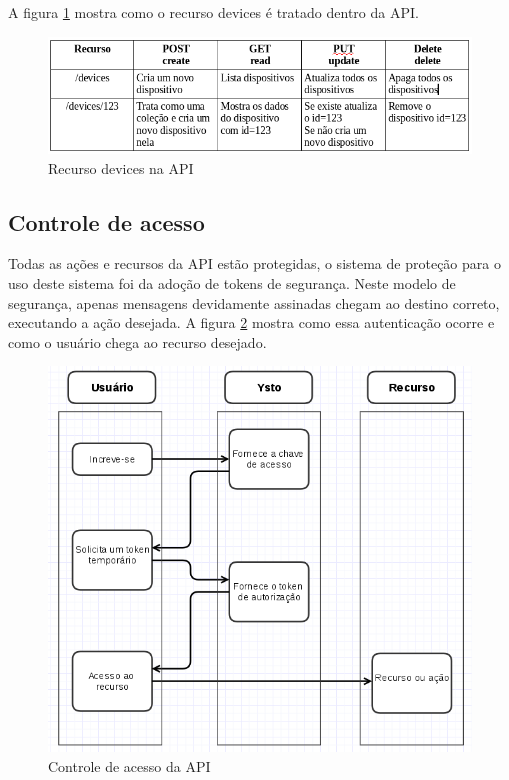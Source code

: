A figura \ref{recurso-devices} mostra como o recurso devices é tratado dentro da API.

\begin{figure}[H]
\caption{\label{recurso-devices} Recurso devices na API}
\includegraphics[scale=0.5]{img/resurso-devices.png}
\end{figure}

\subsection{Controle de acesso}
Todas as ações e recursos da API estão protegidas, o sistema de proteção para o uso deste sistema foi da adoção de tokens de segurança. Neste modelo de segurança, apenas mensagens devidamente assinadas chegam ao destino correto, executando a ação desejada. A figura \ref{controle-acesso} mostra como essa autenticação ocorre e como o usuário chega ao recurso desejado.

\begin{figure}[H]
\caption{\label{controle-acesso} Controle de acesso da API}
\includegraphics[scale=0.5]{img/auth-recursos.png}
\end{figure}

